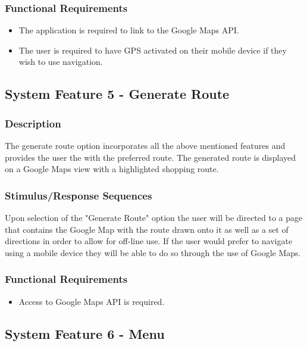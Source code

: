 \documentclass[10pt, a4paper, onecolumn]{scrartcl}
\begin{document}
			\subsubsection{Functional Requirements}
			
				\begin{itemize}
					\item The application is required to link to the Google Maps API. 
					\item The user is required to have GPS activated on their mobile device if they wish to use navigation.
				\end{itemize}
		
		\subsection{System Feature 5 - Generate Route}
		
			\subsubsection{Description}
			
				The generate route option incorporates all the above mentioned features and provides the user the with the preferred route. The generated route is displayed on a Google Maps view with a highlighted shopping route. 
				
			\subsubsection{Stimulus/Response Sequences}
			
				Upon selection of the "Generate Route" option the user will be directed to a page that contains the Google Map with the route drawn onto it as well as a set of directions in order to allow for off-line use. If the user would prefer to navigate using a mobile device they will be able to do so through the use of Google Maps.
				
			\subsubsection{Functional Requirements}
			
				\begin{itemize}
					\item Access to Google Maps API is required.
				\end{itemize}
				
		\subsection{System Feature 6 - Menu}
		
\end{document}
